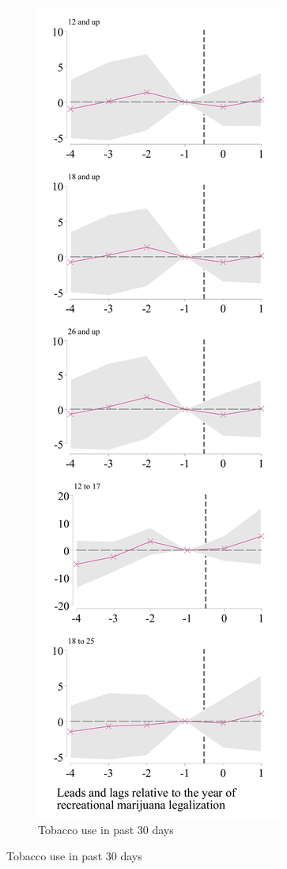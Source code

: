 \documentclass[12pt]{article}%
\begin{document}
\begin{figure}
\begin{minipage}{.9\linewidth}
\begin{subfigure}[b]{0.32\columnwidth}
    \label{fig:lead_lag_alc_30}
  \end{subfigure}
  \hfill %
  \begin{subfigure}[b]{0.32\columnwidth}
      \caption{Tobacco use in past 30 days}
    \includegraphics[width=\linewidth]{../output/plots/event-study-estimates-ln-tob_use_30.pdf}

\end{subfigure}
\end{minipage}
\end{figure}
\end{document}
